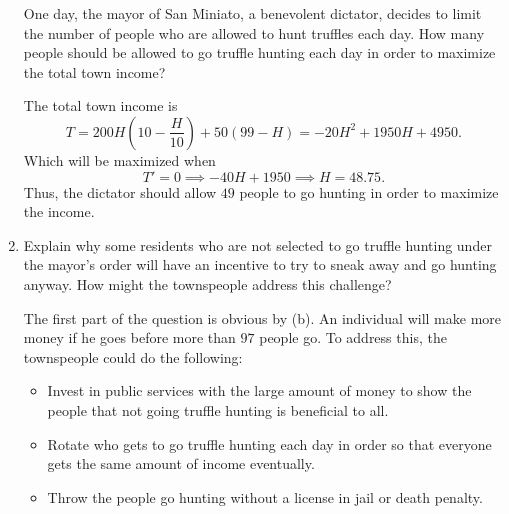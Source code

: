 \documentclass[11pt]{article}
\begin{document}
\begin{enumerate}
\begin{problem}
        One day, the mayor of San Miniato, a benevolent dictator, decides to limit the number of people who
are allowed to hunt truffles each day. How many people should be allowed to go truffle hunting each
day in order to maximize the total town income?
    \end{problem}
    \begin{solution}
        The total town income is 
        \[T = 200H(10 - \frac{H}{10}) + 50(99-H) = -20H^2
 +1950H+4950.\] Which will be maximized when 
        \[T' = 0 \implies  -40H + 1950 \implies H = 48.75.\] Thus, the dictator should allow $49$ people to go hunting in order to maximize the income.
    \end{solution}
    \item 
    \begin{problem}
        Explain why some residents who are not selected to go truffle hunting under
the mayor’s order will have an incentive to try to sneak away and go hunting anyway. How might the
townspeople address this challenge?
    \end{problem}
    \begin{solution}
        The first part of the question is obvious by (b). An individual will make more money if he goes before more than $97$ people go. To address this, the townspeople could do the following:
        \begin{itemize}
            \item Invest in public services with the large amount of money to show the people that not going truffle hunting is beneficial to all.
            \item Rotate who gets to go truffle hunting each day in order so that everyone gets the same amount of income eventually.
            \item Throw the people go hunting without a license in jail or death penalty.
        \end{itemize}
    \end{solution}
\end{enumerate}
\end{document}
